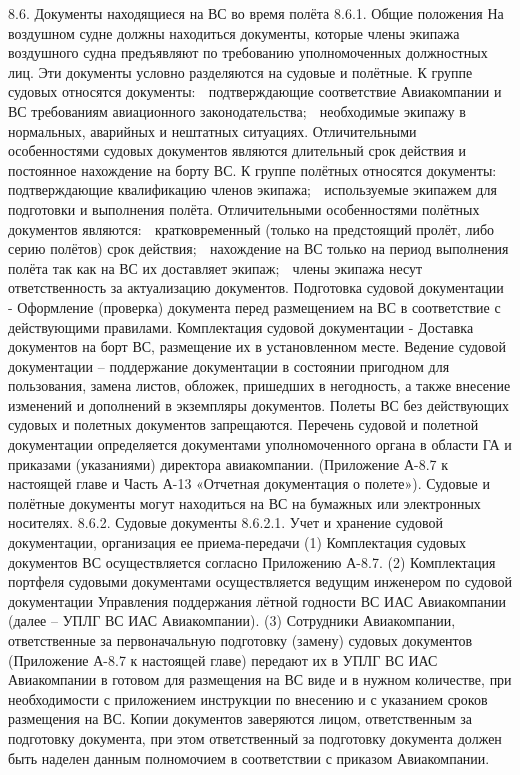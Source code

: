 8.6. Документы находящиеся на ВС во время полёта
8.6.1. Общие положения 
На воздушном судне должны находиться документы, которые члены экипажа воздушного судна предъявляют по требованию уполномоченных должностных лиц. Эти документы условно разделяются на судовые и полётные.
К группе судовых относятся документы:
	подтверждающие соответствие Авиакомпании и ВС требованиям авиационного законодательства;
	необходимые экипажу в нормальных, аварийных и нештатных ситуациях.
Отличительными особенностями судовых документов являются длительный срок действия и постоянное нахождение на борту ВС.
К группе полётных относятся документы:
	подтверждающие квалификацию членов экипажа;
	используемые экипажем для подготовки и выполнения полёта.
Отличительными особенностями полётных документов являются:
	кратковременный (только на предстоящий пролёт, либо серию полётов) срок действия;
	нахождение на ВС только на период выполнения полёта так как на ВС их доставляет экипаж;
	члены экипажа несут ответственность за актуализацию документов. 
Подготовка судовой документации - Оформление (проверка) документа перед размещением на ВС в соответствие с действующими правилами.
Комплектация судовой документации - Доставка документов на борт ВС, размещение их в установленном месте.
Ведение судовой документации – поддержание документации в состоянии пригодном для пользования, замена листов, обложек, пришедших в негодность, а также внесение изменений и дополнений в экземпляры документов.
Полеты ВС без действующих судовых и полетных документов запрещаются.
Перечень судовой и полетной документации определяется документами уполномоченного органа в области ГА и приказами (указаниями) директора авиакомпании. (Приложение А-8.7 к настоящей главе и Часть А-13 «Отчетная документация о полете»). 
Судовые и полётные документы могут находиться на ВС на бумажных или электронных носителях.
8.6.2. Судовые документы
8.6.2.1. Учет и хранение судовой документации, организация ее приема-передачи 
(1) Комплектация судовых документов ВС осуществляется согласно Приложению А-8.7.
(2) Комплектация портфеля судовыми документами осуществляется ведущим инженером по судовой документации Управления поддержания лётной годности ВС ИАС Авиакомпании (далее – УПЛГ ВС ИАС Авиакомпании). 
(3) Сотрудники Авиакомпании, ответственные за первоначальную подготовку (замену) судовых документов (Приложение А-8.7 к настоящей главе) передают их в УПЛГ ВС ИАС Авиакомпании в готовом для размещения на ВС виде и в нужном количестве, при необходимости с приложением инструкции по внесению и с указанием сроков размещения на ВС.
Копии документов заверяются лицом, ответственным за подготовку документа, при этом ответственный за подготовку документа должен быть наделен данным полномочием в соответствии с приказом Авиакомпании. 
